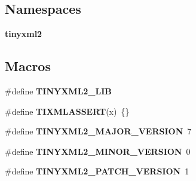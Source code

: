 \subsection*{Namespaces}
\begin{DoxyCompactItemize}
\item 
 \textbf{ tinyxml2}
\end{DoxyCompactItemize}
\subsection*{Macros}
\begin{DoxyCompactItemize}
\item 
\#define \textbf{ T\+I\+N\+Y\+X\+M\+L2\+\_\+\+L\+IB}
\item 
\#define \textbf{ T\+I\+X\+M\+L\+A\+S\+S\+E\+RT}(x)~\{\}
\item 
\#define \textbf{ T\+I\+N\+Y\+X\+M\+L2\+\_\+\+M\+A\+J\+O\+R\+\_\+\+V\+E\+R\+S\+I\+ON}~7
\item 
\#define \textbf{ T\+I\+N\+Y\+X\+M\+L2\+\_\+\+M\+I\+N\+O\+R\+\_\+\+V\+E\+R\+S\+I\+ON}~0
\item 
\#define \textbf{ T\+I\+N\+Y\+X\+M\+L2\+\_\+\+P\+A\+T\+C\+H\+\_\+\+V\+E\+R\+S\+I\+ON}~1
\end{DoxyCompactItemize}
